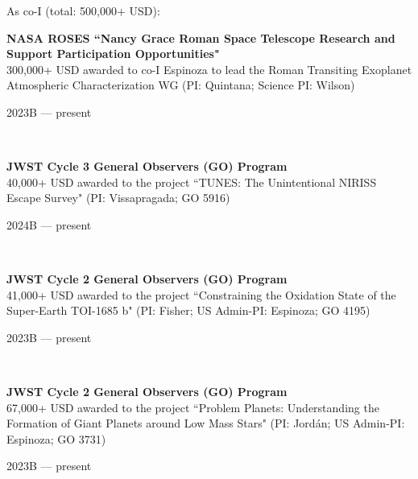 \documentclass[12pt, a4paper]{article} %
\begin{document}
As co-I (total: 500,000+ USD):\\

\begin{minipage}[t]{0.7\textwidth}
\begin{flushleft}%
  \setlength{\leftskip}{0.2cm}%
\textbf{NASA ROSES ``Nancy Grace Roman Space Telescope Research and Support Participation Opportunities" }\\
300,000+ USD awarded to co-I Espinoza to lead the Roman Transiting Exoplanet Atmospheric Characterization WG (PI: Quintana; Science PI: Wilson)
\end{flushleft}
\end{minipage}
\begin{minipage}[t]{0.3\textwidth}
\hfill 2023B --- present
\end{minipage}\\

\begin{minipage}[t]{0.7\textwidth}
\begin{flushleft}%
  \setlength{\leftskip}{0.2cm}%
\textbf{JWST Cycle 3 General Observers (GO) Program}\\
40,000+ USD awarded to the project ``TUNES: The Unintentional NIRISS Escape Survey" (PI: Vissapragada; GO 5916)
\end{flushleft}
\end{minipage}
\begin{minipage}[t]{0.3\textwidth}
\hfill 2024B --- present
\end{minipage}\\

\begin{minipage}[t]{0.7\textwidth}
\begin{flushleft}%
  \setlength{\leftskip}{0.2cm}%
\textbf{JWST Cycle 2 General Observers (GO) Program}\\
41,000+ USD awarded to the project ``Constraining the Oxidation State of the Super-Earth TOI-1685 b" (PI: Fisher; US Admin-PI: Espinoza; GO 4195)
\end{flushleft}
\end{minipage}
\begin{minipage}[t]{0.3\textwidth}
\hfill 2023B --- present
\end{minipage}\\

\begin{minipage}[t]{0.7\textwidth}
\begin{flushleft}%
  \setlength{\leftskip}{0.2cm}%
\textbf{JWST Cycle 2 General Observers (GO) Program}\\
67,000+ USD awarded to the project ``Problem Planets: Understanding the Formation of Giant Planets around Low Mass Stars" (PI: Jord\'an; US Admin-PI: Espinoza; GO 3731)
\end{flushleft}
\end{minipage}
\begin{minipage}[t]{0.3\textwidth}
\hfill 2023B --- present
\end{minipage}\\
\end{document}
